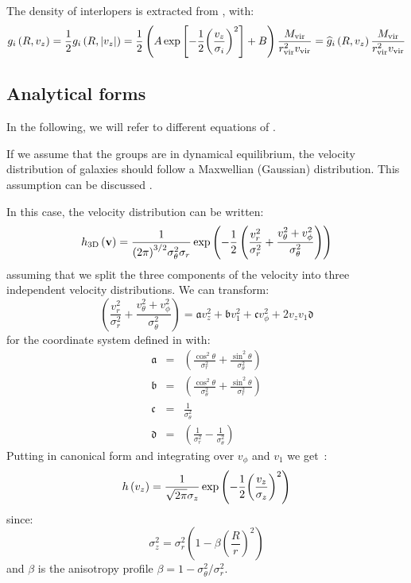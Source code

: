 The density of interlopers is extracted from \citet{MBM+10}, with:
%
\begin{equation}
    g_i\left(R,v_z\right)=\frac{1}{2} g_i\left(R,|v_z|\right)=
    \frac{1}{2}\left(A
        \exp\left[-\frac{1}{2}{\left(\frac{v_z}{\sigma_i}\right)}^2\right]
    +B\right)\frac{M_{\rm vir}}{r_{\rm vir}^2 v_{\rm vir}}=
    \widehat g_i\left(R,v_z\right)\frac{M_{\rm vir}}{r_{\rm vir}^2 v_{\rm vir}}
\end{equation}

\subsection{Analytical forms}
\label{sub:analytical_forms}

In the following, we will refer to different equations of
.

If we assume that the groups are in dynamical equilibrium, the velocity
distribution of galaxies should follow a Maxwellian (Gaussian) distribution.
This assumption can be discussed \citep{Beraldo+14}.

In this case, the velocity distribution can be written:
\begin{equation}
    h_\mathrm{3D}\left(\textbf{v}\right)=
    \frac{1}{{\left({2\pi}\right)}^{3/2}\sigma_{\theta}^2\sigma_r}
    \exp\left(-\frac{1}{2}\left(\frac{v_r^2}{\sigma_r^2}+
    \frac{v_{\theta}^2+v_{\phi}^2}{\sigma_{\theta}^2}\right)\right)
\end{equation}
%
assuming that we split the three components of the velocity into three
independent velocity distributions. We can transform:
%
\begin{equation}
    \label{eq:poly}
    \left(\frac{v_r^2}{\sigma_r^2}+\frac{v_{\theta}^2+
    v_{\phi}^2}{\sigma_{\theta}^2}\right) =
    \mathfrak{a} v_z^2 + \mathfrak{b} v_1^2 +
    \mathfrak{c} v_\phi^2 + 2 v_z v_1 \mathfrak{d}
\end{equation}
%
for the coordinate system defined in  with:
%
\begin{eqnarray}
    \mathfrak{a}&=&\left(\frac{\cos^2\theta}{\sigma_r^2}+
        \frac{\sin^2\theta}{\sigma_\theta^2}\right)\nonumber\\
    \mathfrak{b}&=&\left(\frac{\cos^2\theta}{\sigma_\theta^2}+
        \frac{\sin^2\theta}{\sigma_r^2}\right)\nonumber\\
    \mathfrak{c}&=&\frac{1}{\sigma_\theta^2}\nonumber\\
    \mathfrak{d}&=&\left(\frac{1}{\sigma_r^2}-\frac{1}{\sigma_\theta^2}\right)
\end{eqnarray}
%
Putting  in canonical form and integrating
 over $v_\phi$ and $v_1$ we get~\cite{Mamon+13}:
%
\begin{equation}
    \label{eq:velocity_distribution}
    h\left(v_z\right) = \frac{1}{\sqrt{2\pi}\sigma_z}
    \exp\left(-\frac{1}{2}{\left(\frac{v_z}{\sigma_z}\right)}^2\right)
\end{equation}
%
since:
%
\begin{equation}
    \sigma_z^2 =
    \sigma_r^2\left(1-\beta{\left(\frac{R}{r}\right)}^2\right)
\end{equation}
%
and $\beta$ is the anisotropy profile $\beta=1-\sigma_\theta^2/\sigma_r^2$.

